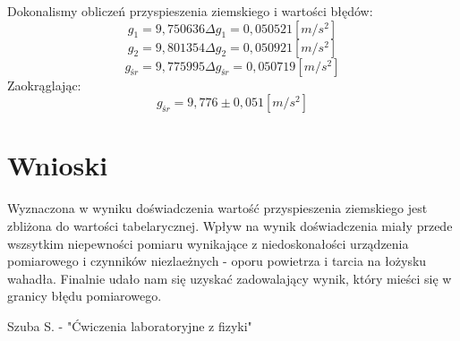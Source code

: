 \documentclass[polish,a4paper]{article}
\begin{document}
Dokonalismy obliczeń przyspieszenia ziemskiego i wartości błędów:
$$g_{1} = 9,750636  \Delta g_{1} = 0,050521 [m/s^{2}]$$
$$g_{2} = 9,801354  \Delta g_{2} = 0,050921 [m/s^{2}]$$
$$g_{śr} = 9,775995  \Delta g_{śr} = 0,050719 [m/s^{2}]$$
Zaokrąglając:
$$g_{śr} = 9,776 \pm 0,051 [m/s^{2}]$$

\section{Wnioski}
Wyznaczona w wyniku doświadczenia wartość przyspieszenia ziemskiego jest zbliżona do wartości tabelarycznej. 
\newline
Wpływ na wynik doświadczenia miały przede wszsytkim niepewności pomiaru wynikające z niedoskonałości urządzenia pomiarowego i czynników niezlaeżnych - oporu powietrza i tarcia na łożysku wahadła.
\newline
Finalnie udało nam się uzyskać zadowalający wynik, który mieści się w granicy błędu pomiarowego.

\begin{thebibliography}{1}
 Szuba S. - "Ćwiczenia laboratoryjne z fizyki"
\end{thebibliography}
\end{document}

